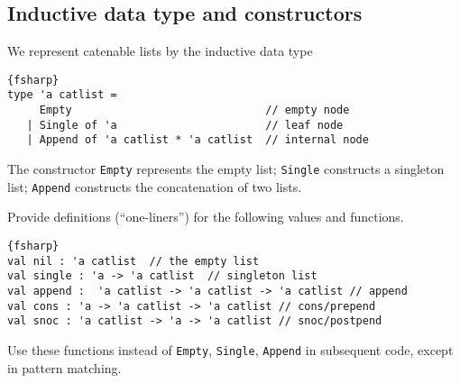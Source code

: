 \subsection*{Inductive data type and constructors}

We represent catenable lists by the inductive data type 
\begin{lstlisting}{fsharp}
type 'a catlist = 
     Empty                              // empty node
   | Single of 'a                       // leaf node
   | Append of 'a catlist * 'a catlist  // internal node
\end{lstlisting}
The constructor \texttt{Empty} represents the empty list; \texttt{Single} constructs a singleton list; \texttt{Append} constructs the concatenation of two lists.

Provide definitions (``one-liners'') for the following values and functions. 
\begin{lstlisting}{fsharp}
val nil : 'a catlist  // the empty list
val single : 'a -> 'a catlist  // singleton list
val append :  'a catlist -> 'a catlist -> 'a catlist // append
val cons : 'a -> 'a catlist -> 'a catlist // cons/prepend
val snoc : 'a catlist -> 'a -> 'a catlist // snoc/postpend
\end{lstlisting}
Use these functions instead of \verb|Empty|, \verb|Single|, \verb|Append| in subsequent code, except in pattern matching.
